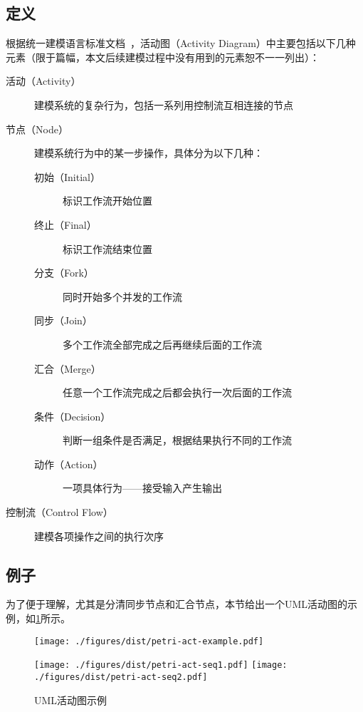 \documentclass[index]{subfiles}
\begin{document}
\subsection{定义}
根据统一建模语言标准文档~，活动图（Activity Diagram）中主要包括以下几种元素（限于篇幅，本文后续建模过程中没有用到的元素恕不一一列出）：
\begin{description}
  \item[活动（Activity）] 建模系统的复杂行为，包括一系列用控制流互相连接的节点
  \item[节点（Node）] 建模系统行为中的某一步操作，具体分为以下几种：
  \begin{description}
    \item[初始（Initial）] 标识工作流开始位置
    \item[终止（Final）] 标识工作流结束位置
    \item[分支（Fork）] 同时开始多个并发的工作流
    \item[同步（Join）] 多个工作流全部完成之后再继续后面的工作流
    \item[汇合（Merge）] 任意一个工作流完成之后都会执行一次后面的工作流
    \item[条件（Decision）] 判断一组条件是否满足，根据结果执行不同的工作流
    \item[动作（Action）] 一项具体行为——接受输入产生输出
  \end{description}
  \item[控制流（Control Flow）] 建模各项操作之间的执行次序
\end{description}

\subsection{例子}
为了便于理解，尤其是分清同步节点和汇合节点，本节给出一个UML活动图的示例，如\cref{fig:petri-act}所示。
\begin{figure}[h]
  \centering%
    {\texttt{[image: ./figures/dist/petri-act-example.pdf]}}\par
    {\texttt{[image: ./figures/dist/petri-act-seq1.pdf]}}
  \hspace{10em}
    {\texttt{[image: ./figures/dist/petri-act-seq2.pdf]}}
  \caption{UML活动图示例\label{fig:petri-act}}
\end{figure}
\end{document}
